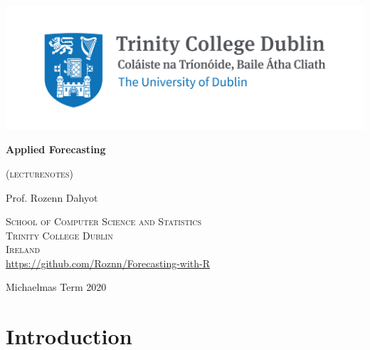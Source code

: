 \documentclass[a4paper,11pt,oneside,onecolumn]{book}
\begin{document}
\renewcommand{\footrulewidth}{1pt}


\begin{titlepage}
	\centering
	
\includegraphics[width=.9\linewidth]{trinity-common-use.jpg}\par\vspace{2cm}

	\vspace{2cm}
	{\huge\bfseries Applied Forecasting\par}
	\vspace{1cm}
	{\scshape (lecturenotes)\par}
	\vspace{2cm}
	{\Large Prof. Rozenn Dahyot\par}
 \vspace{1cm}
{\scshape School of Computer Science and Statistics\\
Trinity College Dublin\\
 Ireland\\}
\href{https://github.com/Roznn/Forecasting-with-R}{https://github.com/Roznn/Forecasting-with-R}
	

	\vfill

	{\large Michaelmas Term  2020 \par}
\end{titlepage}




\tableofcontents
\clearpage



\chapter{Introduction}

\vspace{.5cm}
\end{document}

